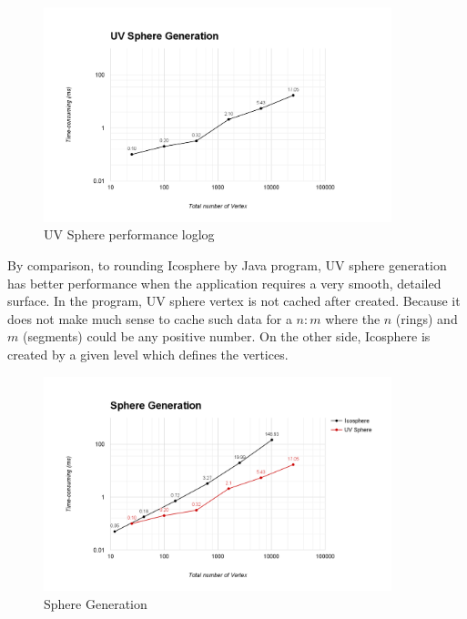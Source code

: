 \begin{figure}[H]
	\caption{UV Sphere performance loglog}
	\label{fig:uv-sphere-performance-loglog}
	\centering
	\includegraphics[width=0.9\textwidth, keepaspectratio]{Figures/uv-sphere-performance-loglog.png}
	\decoRule
\end{figure}

By comparison, to rounding Icosphere by Java program, UV sphere generation has better performance when the application requires a very smooth, detailed surface. In the program, UV sphere vertex is not cached after created. Because it does not make much sense to cache such data for a $n:m$ where the $n$ (rings) and $m$ (segments) could be any positive number. On the other side, Icosphere is created by a given level which defines the vertices.

\begin{figure}[H]
	\caption{Sphere Generation}
	\label{fig:icosphere-and-uv-sphere}
	\centering
	\includegraphics[width=0.9\textwidth, keepaspectratio]{Figures/icosphere-and-uv-sphere.png}
	\decoRule
\end{figure}

